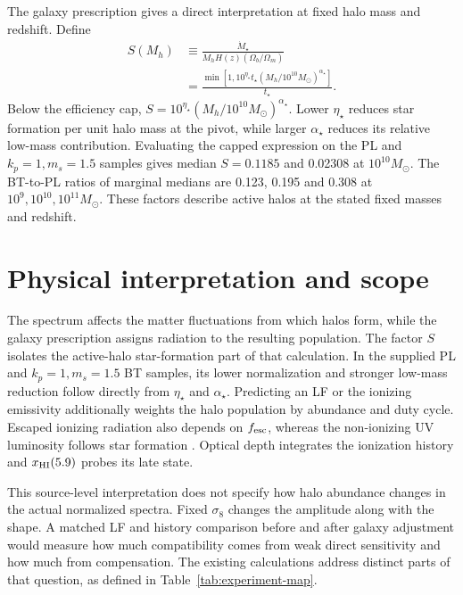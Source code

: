 The galaxy prescription gives a direct interpretation at fixed halo mass and redshift. Define
\begin{align}
S(M_h)&\equiv\frac{\dot M_\star}{M_hH(z)(\Omega_b/\Omega_m)}\nonumber\\
&=\frac{\min\!\left[1,10^{\eta_\star}t_\star(M_h/10^{10}M_\odot)^{\alpha_\star}\right]}{t_\star}.
\label{eq:physics-sfr-factor}
\end{align}
Below the efficiency cap, $S=10^{\eta_\star}(M_h/10^{10}M_\odot)^{\alpha_\star}$. Lower $\eta_\star$ reduces star formation per unit halo mass at the pivot, while larger $\alpha_\star$ reduces its relative low-mass contribution. Evaluating the capped expression on the PL and $k_p=1,m_s=1.5$ samples gives median $S=0.1185$ and 0.02308 at $10^{10}M_\odot$. The BT-to-PL ratios of marginal medians are 0.123, 0.195 and 0.308 at $10^9,10^{10},10^{11}M_\odot$. These factors describe active halos at the stated fixed masses and redshift.

\FloatBarrier
\section{Physical interpretation and scope}\label{initial-condition-scatter-and-limits-of-inference}

The spectrum affects the matter fluctuations from which halos form, while the galaxy prescription assigns radiation to the resulting population. The factor $S$ isolates the active-halo star-formation part of that calculation. In the supplied PL and $k_p=1,m_s=1.5$ BT samples, its lower normalization and stronger low-mass reduction follow directly from $\eta_\star$ and $\alpha_\star$. Predicting an LF or the ionizing emissivity additionally weights the halo population by abundance and duty cycle. Escaped ionizing radiation also depends on $f_{\rm esc}$, whereas the non-ionizing UV luminosity follows star formation \cite{Park2019}. Optical depth integrates the ionization history and $x_{\rm HI}(5.9)$ probes its late state.

This source-level interpretation does not specify how halo abundance changes in the actual normalized spectra. Fixed $\sigma_8$ changes the amplitude along with the shape. A matched LF and history comparison before and after galaxy adjustment would measure how much compatibility comes from weak direct sensitivity and how much from compensation. The existing calculations address distinct parts of that question, as defined in Table~\ref{tab:experiment-map}.

